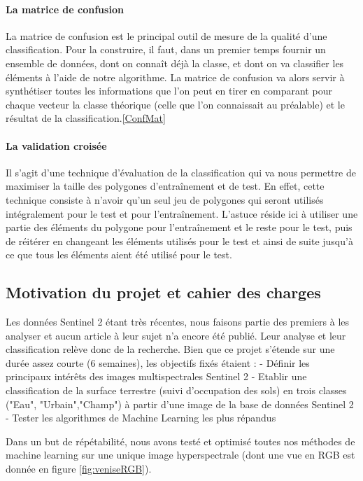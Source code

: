 \paragraph{La matrice de confusion\newline}
La matrice de confusion est le principal outil de mesure de la qualité d'une classification. Pour la construire, il faut, dans un premier temps fournir un ensemble de données, dont on connaît déjà la classe, et dont on va classifier les éléments à l'aide de notre algorithme. La matrice de confusion va alors servir à synthétiser toutes les informations que l'on peut en tirer en comparant pour chaque vecteur la classe théorique (celle que l'on connaissait au préalable) et le résultat de la classification.\ref{ConfMat}

\paragraph{La validation croisée\newline}
Il s'agit d'une technique d'évaluation de la classification qui va nous permettre de maximiser la taille des polygones d'entraînement et de test. En effet, cette technique consiste à n'avoir qu'un seul jeu de polygones qui seront utilisés intégralement pour le test et pour l'entraînement. L'astuce réside ici à utiliser une partie des éléments du polygone pour l'entraînement et le reste pour le test, puis de réitérer en changeant les éléments utilisés pour le test et ainsi de suite jusqu'à ce que tous les éléments aient été utilisé pour le test.


\subsection{Motivation du projet et cahier des charges}

Les données Sentinel 2 étant très récentes, nous faisons partie des premiers à les analyser et aucun article à leur sujet n'a encore été publié. Leur analyse et leur classification relève donc de la recherche. 
Bien que ce projet s'étende sur une durée assez courte (6 semaines), les objectifs fixés étaient :
  - Définir les principaux intérêts des images multispectrales Sentinel 2
  - Etablir une classification de la surface terrestre (suivi d'occupation des sols) en trois classes ("Eau", "Urbain","Champ") à partir d'une image de la base de données Sentinel 2
  - Tester les algorithmes de Machine Learning les plus répandus
  
  Dans un but de répétabilité, nous avons testé et optimisé toutes nos méthodes de machine learning sur une unique image hyperspectrale (dont une vue en RGB est donnée en figure \ref{fig:veniseRGB}).
 

